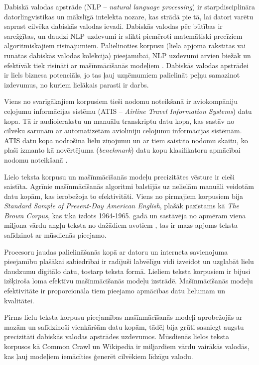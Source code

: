 Dabiskā valodas apstrāde (NLP -- \textit{natural language processing}) ir starpdisciplināra datorlingvistikas un mākslīgā intelekta nozare, kas strādā pie tā, lai datori varētu saprast cilvēka dabiskās valodas ievadi. Dabiskās valodas pēc būtības ir sarežģītas, un daudzi NLP uzdevumi ir slikti piemēroti matemātiski precīziem algoritmiskajiem risinājumiem. Palielinoties korpusu (liela apjoma rakstītas vai runātas dabiskās valodas kolekcija) pieejamībai, NLP uzdevumi arvien biežāk un efektīvāk tiek risināti ar mašīnmācīšanās modeļiem \cite{nlp2018}. Dabiskās valodas apstrādei ir liels biznesa potenciāls, jo tas ļauj uzņēmumiem palielināt peļņu samazinot izdevumus, no kuriem lielākais parasti ir darbs. %


Viens no svarīgākajiem korpusiem tieši nodomu noteikšanā ir aviokompāniju ceļojumu informācijas sistēmu (ATIS -- \textit{Airline Travel Information Systems}) datu kopa. Tā ir audioierakstu un manuālu transkriptu datu kopa, kas sastāv no cilvēku sarunām ar automatizētām aviolīniju ceļojumu informācijas sistēmām. ATIS datu kopa nodrošina lielu ziņojumu un ar tiem saistīto nodomu skaitu, ko plaši izmanto kā novērtējuma (\textit{benchmark}) datu kopu klasifikatoru apmācībai nodomu noteikšanā \cite{atis1990}.

Lielo teksta korpusu un mašīnmācīšanās modeļu precizitātes vēsture ir cieši saistīta. Agrīnie mašīnmācīšanās algoritmi balstījās uz nelielām manuāli veidotām datu kopām, kas ierobežoja to efektivitāti. Viens no pirmajiem korpusiem bija \textit{Standard Sample of Present-Day American English}, plašāk pazīstams kā \textit{The Brown Corpus}, kas tika izdots 1964-1965. gadā un sastāvēja no apmēram viena miljona vārdu angļu teksta no dažādiem avotiem \cite{brown-corpus}, tas ir mazs apjoms teksta salīdzinot ar mūsdienās pieejamo.

Procesoru jaudas palielināšanās kopā ar datoru un interneta savienojuma pieejamību plašākai sabiedrībai ir radījuši labvēlīgu vidi izveidot un uzglabāt lielu daudzumu digitālo datu, tostarp teksta formā. Lieliem teksta korpusiem ir bijusi izšķiroša loma efektīvu mašīnmācīšanās modeļu izstrādē. Mašīnmācīšanās modeļu efektivitāte ir proporcionāla tiem pieejamo apmācības datu lielumam un kvalitātei. %

Pirms lielu teksta korpusu pieejamības mašīnmācīšanās modeļi aprobežojās ar mazām un salīdzinoši vienkāršām datu kopām, tādēļ bija grūti sasniegt augstu precizitāti dabiskās valodas apstrādes uzdevumos. Mūsdienās lielos teksta korpusos kā Common Crawl un Wikipedia ir miljardiem vārdu vairākās valodās, kas ļauj modeļiem iemācīties ģenerēt cilvēkiem līdzīgu valodu.

